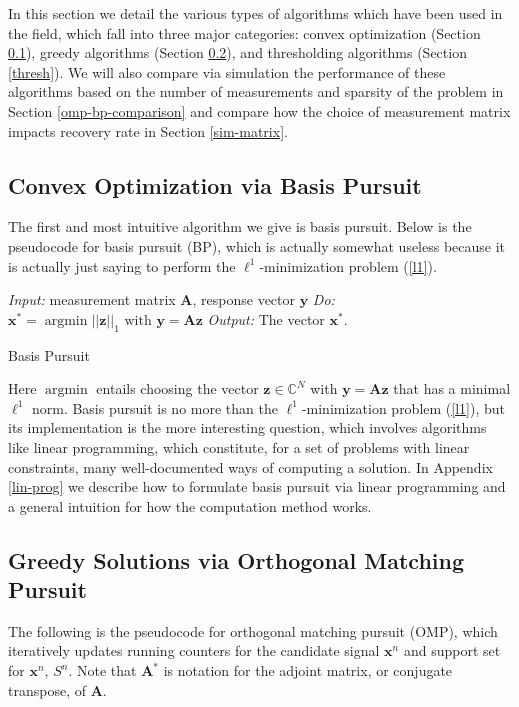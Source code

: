 \documentclass[12pt,a4paper]{amsart}
\numberwithin{equation}{section}
\theoremstyle{plain}
\theoremstyle{definition}
\newcommand{\BC}{\mathbb C}
\newcommand{\bdy}{\mathbf{y}}
\newcommand{\bdx}{\mathbf{x}}
\newcommand{\bdz}{\mathbf{z}}
\newcommand{\bdA}{\mathbf{A}}
\DeclareMathOperator{\argmin}{argmin}
\begin{document}
In this section we detail the various types of algorithms which have been used in the field, which fall into three major categories: convex optimization (Section \ref{bp}), greedy algorithms (Section \ref{omp}), and thresholding algorithms (Section \ref{thresh}). We will also compare via simulation the performance of these algorithms based on the number of measurements and sparsity of the problem in Section \ref{omp-bp-comparison} and compare how the choice of measurement matrix impacts recovery rate in Section \ref{sim-matrix}.

\subsection{Convex Optimization via Basis Pursuit}\label{bp}

The first and most intuitive algorithm we give is basis pursuit. Below is the pseudocode for basis pursuit (BP), which is actually somewhat useless because it is actually just saying to perform the $\ell^1$-minimization problem (\ref{l1}).

\begin{algorithm}
 \textit{Input:} measurement matrix $\bdA$, response vector $\bdy$\;
 \textit{Do:} $\bdx^*=\argmin||\bdz||_1 \text{ with }\bdy=\bdA\bdz$\;
 \textit{Output:} The vector $\bdx^*$.
 \caption{Basis Pursuit}
\end{algorithm}

Here $\argmin$ entails choosing the vector $\bdz\in\BC^N$ with $\bdy=\bdA\bdz$ that has a minimal $\ell^1$ norm. Basis pursuit is no more than the $\ell^1$-minimization problem (\ref{l1}), but its implementation is the more interesting question, which involves algorithms like linear programming, which constitute, for a set of problems with linear constraints, many well-documented ways of computing a solution. In Appendix \ref{lin-prog} we describe how to formulate basis pursuit via linear programming and a general intuition for how the computation method works.

\subsection{Greedy Solutions via Orthogonal Matching Pursuit}\label{omp}

The following is the pseudocode for orthogonal matching pursuit (OMP), which iteratively updates running counters for the candidate signal $\bdx^n$ and support set for $\bdx^n$, $S^n$. Note that $\bdA^*$ is notation for the adjoint matrix, or conjugate transpose, of $\bdA$.
\end{document}
